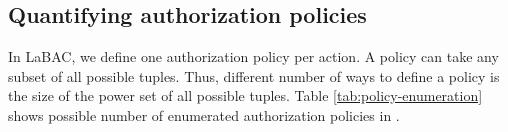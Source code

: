  
\subsection{Quantifying \labacOneOneOne{} authorization policies}
In LaBAC, we define one authorization policy per action.  A policy can take any subset of all possible tuples. Thus, different number of ways to define a policy  is the size of the power set of all possible tuples.  Table \ref{tab:policy-enumeration} shows possible number of enumerated authorization policies in \labac{}.





